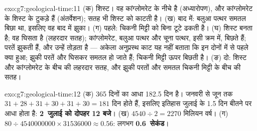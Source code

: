 \begin{solution}{exo:g7:geological-time:11}
(क) शिस्ट। वह कांग्लोमरेट के नीचे है (अध्यारोपण), और कांग्लोमरेट के  शिस्ट के
टुकड़े हैं (अंतर्वेशन);  सतह भी शिस्ट को काटती है। (ख) बाद में: बलुआ पत्थर
समतल बिछा था, इसलिए वह बाद में झुका। (ग) पहले: चिकनी मिट्टी  को बिना टूटे
ढकती है। (घ) शिस्ट बनता है; वह घिसता है (लहरदार सतह); कांग्लोमरेट, बलुआ पत्थर और
चूना पत्थर, इसी क्रम में, बिछते हैं; परतें झुकती हैं, और  उन्हें तोड़ता है ---
अकेला अनुप्रस्थ काट यह नहीं बताता कि इन दोनों में से पहले क्या हुआ; झुकी परतें और
 घिसकर समतल हो जाते हैं; चिकनी मिट्टी ऊपर बिछती है। (ङ) दो: शिस्ट और
कांग्लोमरेट के बीच की लहरदार सतह, और झुकी परतों और समतल चिकनी मिट्टी के बीच
की सतह।
\end{solution}

\begin{solution}{exo:g7:geological-time:12}
(क) 365 दिनों का आधा 182.5 दिन है। जनवरी से जून तक
$31+28+31+30+31+30 = 181$ दिन होते हैं, इसलिए इतिहास जुलाई के 1.5 दिन बीतने पर आधा
होता है: \textbf{2~जुलाई को दोपहर 12 बजे}। (ख) $4540 \div 2 = 2270$ मिलियन
वर्ष। (ग) $80 \div \num{4540000000} \times \num{31536000} \approx 0.56$:
लगभग \textbf{0.6~सेकंड}।
\end{solution}

